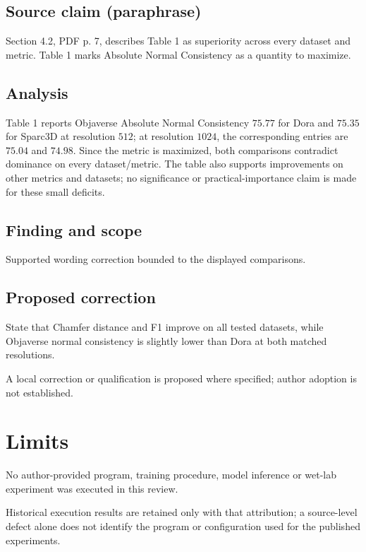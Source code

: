 \documentclass[11pt]{article}
\begin{document}
\subsection*{Source claim (paraphrase)}

Section 4.2, PDF p. 7, describes Table 1 as superiority across every dataset and metric. Table 1 marks Absolute Normal Consistency as a quantity to maximize.

\subsection*{Analysis}

Table 1 reports Objaverse Absolute Normal Consistency \(75.77\) for Dora and \(75.35\) for Sparc3D at resolution \(512\); at resolution \(1024\), the corresponding entries are \(75.04\) and \(74.98\). Since the metric is maximized, both comparisons contradict dominance on every dataset/metric. The table also supports improvements on other metrics and datasets; no significance or practical-importance claim is made for these small deficits.

\subsection*{Finding and scope}

Supported wording correction bounded to the displayed comparisons.

\subsection*{Proposed correction}

State that Chamfer distance and F1 improve on all tested datasets, while Objaverse normal consistency is slightly lower than Dora at both matched resolutions.

A local correction or qualification is proposed where specified; author adoption is not established.

\section*{Limits}

No author-provided program, training procedure, model inference or wet-lab experiment was executed in this review.\par

Historical execution results are retained only with that attribution; a source-level defect alone does not identify the program or configuration used for the published experiments.\par
\end{document}
